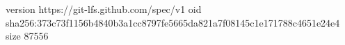 version https://git-lfs.github.com/spec/v1
oid sha256:373c73f1156b4840b3a1cc8797fe5665da821a7f08145c1e171788c4651e24e4
size 87556
